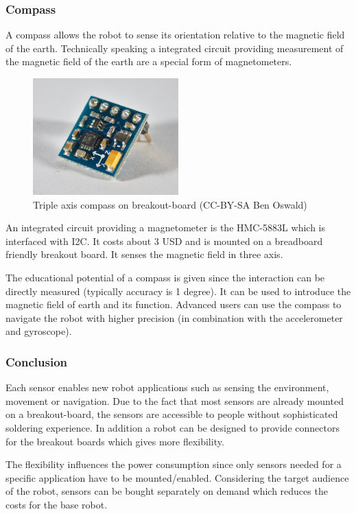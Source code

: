 \documentclass[11pt,a4paper]{article}
\begin{document}
\subsubsection{Compass}
A compass allows the robot to sense its orientation relative to the magnetic field of the earth. Technically speaking a integrated circuit providing measurement of the magnetic field of the earth are a special form of magnetometers.

\begin{figure}[H]
  \centering
  \includegraphics[width=0.5\textwidth]{images/30_compass.jpg}
  \caption{Triple axis compass on breakout-board (CC-BY-SA Ben Oswald)}
\end{figure}

An integrated circuit providing a magnetometer is the HMC-5883L which is interfaced with I2C. It costs about 3 USD and is mounted on a breadboard friendly breakout board. It senses the magnetic field in three axis.


The educational potential of a compass is given since the interaction can be directly measured (typically accuracy is 1 degree). It can be used to introduce the magnetic field of earth and its function. Advanced users can use the compass to navigate the robot with higher precision (in combination with the accelerometer and gyroscope).
\subsubsection{Conclusion}
Each sensor enables new robot applications such as sensing the environment, movement or navigation. Due to the fact that most sensors are already mounted on a breakout-board, the sensors are accessible to people without sophisticated soldering experience. In addition a robot can be designed to provide connectors for the breakout boards which gives more flexibility.

The flexibility influences the power consumption since only sensors needed for a specific application have to be mounted/enabled. Considering the target audience of the robot, sensors can be bought separately on demand which reduces the costs for the base robot.
\end{document}
